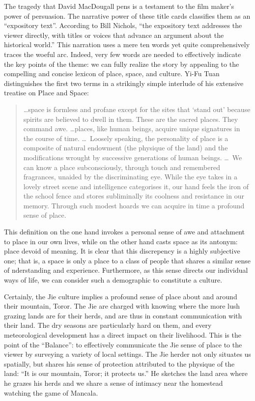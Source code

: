\documentclass[12pt, letterpaper, oneside]{article}
\begin{document}
The tragedy that David MacDougall pens is a testament to the film maker's power of persuasion. The narrative power of these title cards classifies them as an ``expository text''. According to Bill Nichols, ``the expository text addresses the viewer directly, with titles or voices that advance an argument about the historical world.'' \autocite[34]{nichols} This narration uses a mere ten words yet quite comprehensively traces the woeful arc. Indeed, very few words are needed to effectively indicate the key points of the theme: we can fully realize the story by appealing to the compelling and concise lexicon of place, space, and culture. Yi-Fu Tuan distinguishes the first two terms in a strikingly simple interlude of his extensive treatise on Place and Space:
\begin{quote}
\ldots space is formless and profane except for the sites that `stand out' because spirits are believed to dwell in them. These are the sacred places. They command awe. \ldots places, like human beings, acquire unique signatures in the course of time. \ldots\ Loosely speaking, the personality of place is a composite of natural endowment (the physique of the land) and the modifications wrought by successive generations of human beings. \ldots\ We can know a place subconsciously, through touch and remembered fragrances, unaided by the discriminating eye. While the eye takes in a lovely street scene and intelligence categorises it, our hand feels the iron of the school fence and stores subliminally its coolness and resistance in our memory. Through such modest hoards we can acquire in time a profound sense of place. \autocite[410-411]{tuan1979space}
\end{quote}
This definition on the one hand invokes a personal sense of awe and attachment to place in our own lives, while on the other hand casts space as its antonym: place devoid of meaning. It is clear that this discrepency is a highly subjective one; that is, a space is only a place to a class of people that shares a similar sense of nderstanding and experience. Furthermore, as this sense directs our individual ways of life, we can consider such a demographic to constitute a culture.

Certainly, the Jie culture implies a profound sense of place about and around their mountain, Toror. The Jie are charged with knowing where the more lush grazing lands are for their herds, and are thus in constant communication with their land. The dry seasons are particularly hard on them, and every meteorological development has a direct impact on their livelihood. This is the point of the ``Balance'': to effectively communicate the Jie sense of place to the viewer by surveying a variety of local settings. The Jie herder not only situates us spatially, but shares his sense of protection attributed to the physique of the land: ``It is our mountain, Toror; it protects us.'' He sketches the land area where he grazes his herds and we share a sense of intimacy near the homestead watching the game of Mancala.
\end{document}

